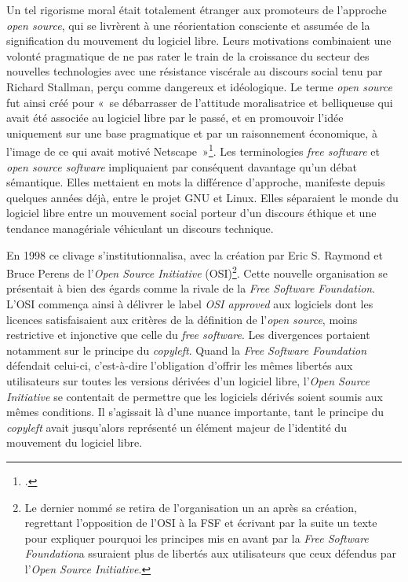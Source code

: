 \documentclass{FramateX}
\begin{document}
\begin{refsection}
Un tel rigorisme moral était totalement étranger aux promoteurs de
l'approche \textit{open source}, qui se livrèrent à une réorientation
consciente et assumée de la signification du mouvement du logiciel
libre. Leurs motivations combinaient une volonté pragmatique de ne pas
rater le train de la croissance du secteur des nouvelles technologies
avec une résistance viscérale au discours social tenu par Richard
Stallman, perçu comme dangereux et idéologique. Le terme \textit{open
source} fut ainsi créé pour «~se débarrasser de l'attitude
moralisatrice et belliqueuse qui avait été associée au logiciel libre
par le passé, et en promouvoir l'idée uniquement sur une base
pragmatique et par un raisonnement économique, à l'image de ce qui
avait motivé Netscape~»\footnote{\cite{tiemannhistory2012}.}. Les
terminologies \textit{free software} et \textit{open source
software} impliquaient par conséquent davantage qu'un débat
sémantique. Elles mettaient en mots la différence d'approche, manifeste
depuis quelques années déjà, entre le projet GNU et Linux. Elles
séparaient le monde du logiciel libre entre un mouvement social porteur
d'un discours éthique et une tendance managériale
véhiculant un discours technique. 

En 1998 ce clivage s'institutionnalisa, avec la création par Eric S.
Raymond et Bruce Perens de l'\textit{Open Source Initiative} (OSI)\footnote{Le dernier nommé se retira de l'organisation un an
après sa création, regrettant l'opposition de l'OSI à la FSF et
écrivant par la suite un texte pour expliquer pourquoi les principes
mis en avant par la \textit{Free Software Foundation}a ssuraient plus
de libertés aux utilisateurs que ceux défendus par l'\textit{Open
Source Initiative}.}. Cette nouvelle organisation se présentait à bien
des égards comme la rivale de la \textit{Free Software Foundation}.
L'OSI commença ainsi à délivrer le label \textit{OSI approved} aux
logiciels dont les licences satisfaisaient aux critères de la
définition de l'\textit{open source}, moins
restrictive et injonctive que celle du \textit{free software}. Les
divergences portaient notamment sur le principe du \textit{copyleft}. Quand la \textit{Free Software Foundation} défendait celui-ci,
c'est-à-dire l'obligation d'offrir
les mêmes libertés aux utilisateurs sur toutes les versions dérivées
d'un logiciel libre, l'\textit{Open Source Initiative} se contentait de permettre que les logiciels dérivés soient soumis aux
mêmes conditions. Il s'agissait là d'une nuance importante, tant le
principe du \textit{copyleft} avait jusqu'alors
représenté un élément majeur de l'identité du mouvement du logiciel
libre.


\end{refsection}
\end{document}
